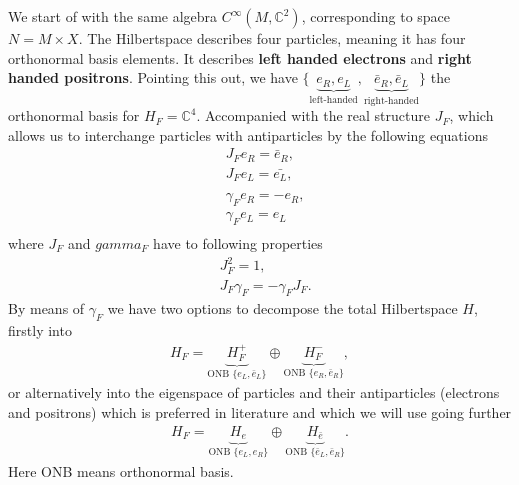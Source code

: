 We start of with the same algebra $C^\infty(M, \mathbb{C}^2)$, corresponding
to space $N= M\times X$. The Hilbertspace describes four particles, meaning
it has four orthonormal basis elements. It describes \textbf{left handed
electrons} and \textbf{right handed positrons}. Pointing this out, we have
$\{ \underbrace{e_R, e_L}_{\text{left-handed}}, \underbrace{\bar{e}_R,
\bar{e}_L}_{\text{right-handed}}\}$ the orthonormal basis for $H_F =
\mathbb{C}^4$. Accompanied with the real structure $J_F$, which allows us to
interchange particles with antiparticles by the following equations
\begin{align}
    &J_F e_R = \bar{e}_R, \\
    &J_F e_L = \bar{e_L}, \\
    \nonumber \\
    &\gamma _F e_R = -e_R,\\
    &\gamma_F e_L = e_L \\
\end{align}
where $J_F$ and $gamma_F$ have to following properties
\begin{align}
    &J_F^2 = 1,\\
    & J_F \gamma_F  = - \gamma_F J_F.
\end{align}
By means of $\gamma_F$ we have two options to decompose the total
Hilbertspace $H$, firstly into
\begin{align}
    H_F = \underbrace{H_F^+}_{\text{ONB } \{e_L, \bar{e}_L\}}
    \oplus \underbrace{H_F^-}_{\text{ONB } \{e_R, \bar{e}_R\}},
\end{align}
or alternatively into the eigenspace of particles and their
antiparticles (electrons and positrons) which is preferred in literature and
which we will use going further
\begin{align}
    H_F = \underbrace{H_{e}}_{\text{ONB } \{e_L, e_R\}} \oplus
    \underbrace{H_{\bar{e}}}_{\text{ONB } \{\bar{e}_L, \bar{e}_R\}}.
\end{align}
Here ONB means orthonormal basis.

